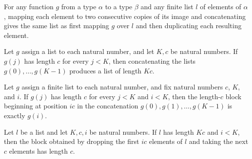 \begin{theorem}
\label{Randomized.flatMap_dup_map}
\leanok
{}
For any function $g$ from a type $\alpha$ to a type $\beta$ and any finite list $l$ of
elements of $\alpha$, mapping each element to two consecutive copies of its image and
concatenating gives the same list as first mapping $g$ over $l$ and then duplicating
each resulting element.
\end{theorem}

\begin{theorem}
\label{Randomized.length_flatMap_range}
\leanok
{}
Let $g$ assign a list to each natural number, and let $K,c$ be natural numbers. If
$g(j)$ has length $c$ for every $j<K$, then concatenating the lists $g(0),\ldots,g(K-1)$
produces a list of length $Kc$.
\end{theorem}

\begin{theorem}
\label{Randomized.flatMap_range_drop_take}
\leanok
{}
Let $g$ assign a finite list to each natural number, and fix natural numbers $c$, $K$,
and $i$. If $g(j)$ has length $c$ for every $j<K$ and $i<K$, then the length-$c$ block
beginning at position $ic$ in the concatenation $g(0),g(1),\ldots,g(K-1)$ is exactly
$g(i)$.
\end{theorem}

\begin{theorem}
\label{Randomized.length_block}
\leanok
{}
Let $l$ be a list and let $K,c,i$ be natural numbers. If $l$ has length $Kc$ and $i<K$,
then the block obtained by dropping the first $ic$ elements of $l$ and taking the next
$c$ elements has length $c$.
\end{theorem}

